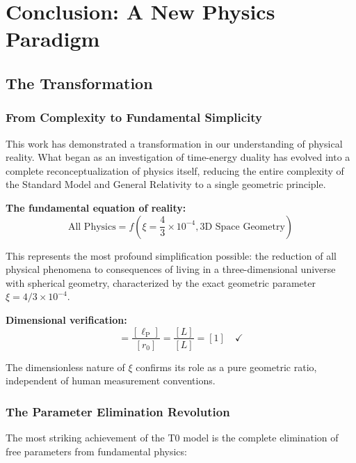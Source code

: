 \documentclass[12pt,a4paper]{report}
\newcommand{\lP}{\ell_{\text{P}}}         %
\newcommand{\rzero}{r_0}                  %
\begin{document}
	\chapter{Conclusion: A New Physics Paradigm}
\label{chap:conclusion}

\section{The Transformation}
\label{sec:revolutionary_transformation}

\subsection{From Complexity to Fundamental Simplicity}
\label{subsec:complexity_to_simplicity}

This work has demonstrated a transformation in our understanding of physical reality. What began as an investigation of time-energy duality has evolved into a complete reconceptualization of physics itself, reducing the entire complexity of the Standard Model and General Relativity to a single geometric principle.

\textbf{The fundamental equation of reality:}
\begin{equation}
	\boxed{\text{All Physics} = f\left(\xi = \frac{4}{3} \times 10^{-4}, \text{3D Space Geometry}\right)}
\end{equation}

This represents the most profound simplification possible: the reduction of all physical phenomena to consequences of living in a three-dimensional universe with spherical geometry, characterized by the exact geometric parameter $\xi = 4/3 \times 10^{-4}$.

\textbf{Dimensional verification:}
\begin{equation}
	[\xi] = \frac{[\lP]}{[\rzero]} = \frac{[L]}{[L]} = [1] \quad \checkmark
\end{equation}

The dimensionless nature of $\xi$ confirms its role as a pure geometric ratio, independent of human measurement conventions.

\subsection{The Parameter Elimination Revolution}
\label{subsec:parameter_elimination}

The most striking achievement of the T0 model is the complete elimination of free parameters from fundamental physics:
\end{document}

